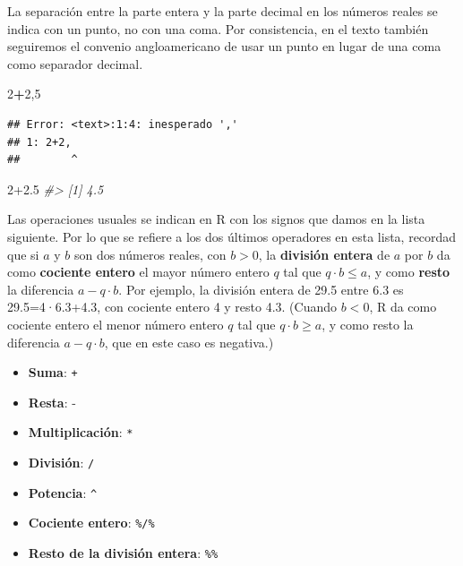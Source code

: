 \documentclass[
]{book}
\newenvironment{Shaded}{\begin{snugshade}}{\end{snugshade}}
\newcommand{\CommentTok}[1]{\textcolor[rgb]{0.56,0.35,0.01}{\textit{#1}}}
\newcommand{\DecValTok}[1]{\textcolor[rgb]{0.00,0.00,0.81}{#1}}
\newcommand{\FloatTok}[1]{\textcolor[rgb]{0.00,0.00,0.81}{#1}}
\newcommand{\NormalTok}[1]{#1}
\newcommand{\OperatorTok}[1]{\textcolor[rgb]{0.81,0.36,0.00}{\textbf{#1}}}
\providecommand{\tightlist}{%
  \setlength{\itemsep}{0pt}\setlength{\parskip}{0pt}}
\theoremstyle{definition}
\theoremstyle{definition}
\theoremstyle{definition}
\theoremstyle{remark}
\begin{document}
La separación entre la parte entera y la parte decimal en los números reales se indica con un punto, no con una coma. Por consistencia, en el texto también seguiremos el convenio angloamericano de usar un punto en lugar de una coma como separador decimal.

\begin{Shaded}
\begin{Highlighting}[]
\DecValTok{2}\OperatorTok{+}\DecValTok{2}\NormalTok{,}\DecValTok{5}
\end{Highlighting}
\end{Shaded}

\begin{verbatim}
## Error: <text>:1:4: inesperado ','
## 1: 2+2,
##        ^
\end{verbatim}

\begin{Shaded}
\begin{Highlighting}[]
\DecValTok{2}\FloatTok{+2.5}
\CommentTok{\#\textgreater{} [1] 4.5}
\end{Highlighting}
\end{Shaded}

Las operaciones usuales se indican en R con los signos que damos en la lista siguiente.
Por lo que se refiere a los dos últimos operadores en esta lista, recordad que si \(a\) y \(b\) son dos números reales, con \(b>0\), la \textbf{división entera} de \(a\) por \(b\) da como \textbf{cociente entero} el mayor número entero \(q\) tal que \(q\cdot b\leqslant a\), y como \textbf{resto}
la diferencia \(a-q\cdot b\). Por ejemplo, la división entera de 29.5 entre 6.3 es 29.5=4·6.3+4.3, con cociente entero 4 y resto 4.3. (Cuando \(b<0\), R da como cociente entero el menor número entero \(q\) tal que \(q\cdot b\geqslant a\), y como resto la diferencia \(a-q\cdot b\), que en este caso es negativa.)

\begin{itemize}
\tightlist
\item
  \textbf{Suma}: \texttt{+}
\item
  \textbf{Resta}: -
\item
  \textbf{Multiplicación}: \texttt{*}
\item
  \textbf{División}: \texttt{/}
\item
  \textbf{Potencia}: \texttt{\^{}}
\item
  \textbf{Cociente entero}: \texttt{\%/\%}
\item
  \textbf{Resto de la división entera}: \texttt{\%\%}
\end{itemize}
\end{document}
